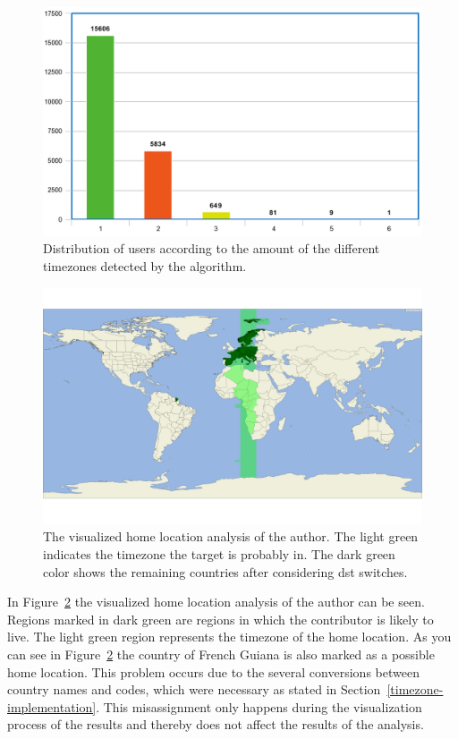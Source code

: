 \begin{figure}[H]
    \includegraphics[scale=0.38]{./graphs/analysis/timezone-distribution}
    \centering
    \caption{Distribution of users according to the amount of the different timezones detected by the algorithm.}\label{fig:timezone-distribution}
\end{figure}

\begin{figure}[H]
    \includegraphics[scale=0.10]{./graphs/analysis/author-home-location}
    \centering
    \caption{The visualized home location analysis of the author.
    The light green indicates the timezone the target is probably in.
    The dark green color shows the remaining countries after considering \ac{dst} switches.}\label{fig:author-home-location}
\end{figure}

In Figure~\ref{fig:author-home-location} the visualized home location analysis of the author can be seen.
Regions marked in dark green are regions in which the contributor is likely to live.
The light green region represents the timezone of the home location.
As you can see in Figure~\ref{fig:author-home-location} the country of French Guiana is also marked as a possible home location.
This problem occurs due to the several conversions between country names and codes, which were necessary as stated in Section~\ref{timezone-implementation}.
This misassignment only happens during the visualization process of the results and thereby does not affect the results of the analysis.

